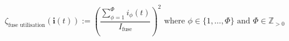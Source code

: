 \begin{equation}
	\zeta_\text{fuse utilisation}(\textbf{i}(t)) :=%
	\left(\frac{\sum_{\phi=1}^{\Phi}{i_\phi(t)}}{I_\text{fuse}}\right)^2%
	\text{ where } \phi \in \{1, \dots, \Phi\}%
	\text{ and } \Phi \in \mathbb{Z}_{>0}
	\label{ch1:equ:fuse-utilisation}
\end{equation}